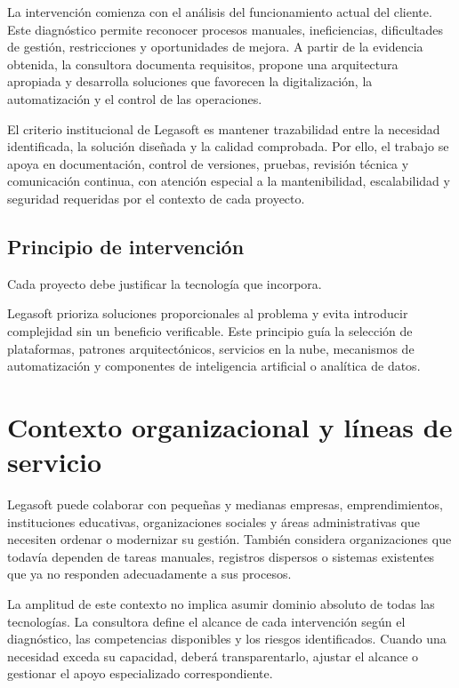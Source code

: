 La intervención comienza con el análisis del funcionamiento actual del cliente.
Este diagnóstico permite reconocer procesos manuales, ineficiencias, dificultades
de gestión, restricciones y oportunidades de mejora. A partir de la evidencia
obtenida, la consultora documenta requisitos, propone una arquitectura apropiada
y desarrolla soluciones que favorecen la digitalización, la automatización y el
control de las operaciones.

El criterio institucional de Legasoft es mantener trazabilidad entre la necesidad
identificada, la solución diseñada y la calidad comprobada. Por ello, el trabajo
se apoya en documentación, control de versiones, pruebas, revisión técnica y
comunicación continua, con atención especial a la mantenibilidad, escalabilidad y
seguridad requeridas por el contexto de cada proyecto.

\subsection{Principio de intervención}

\begin{nota}
Cada proyecto debe justificar la tecnología que incorpora.
\end{nota}

Legasoft prioriza soluciones proporcionales al problema y evita introducir
complejidad sin un beneficio verificable. Este principio guía la selección de
plataformas, patrones arquitectónicos, servicios en la nube, mecanismos de
automatización y componentes de inteligencia artificial o analítica de datos.

\section{Contexto organizacional y líneas de servicio}

Legasoft puede colaborar con pequeñas y medianas empresas, emprendimientos,
instituciones educativas, organizaciones sociales y áreas administrativas que
necesiten ordenar o modernizar su gestión. También considera organizaciones que
todavía dependen de tareas manuales, registros dispersos o sistemas existentes
que ya no responden adecuadamente a sus procesos.

La amplitud de este contexto no implica asumir dominio absoluto de todas las
tecnologías. La consultora define el alcance de cada intervención según el
diagnóstico, las competencias disponibles y los riesgos identificados. Cuando una
necesidad exceda su capacidad, deberá transparentarlo, ajustar el alcance o
gestionar el apoyo especializado correspondiente.

